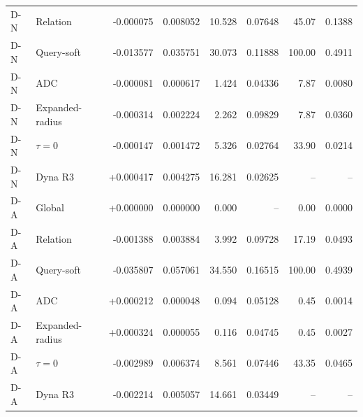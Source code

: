 \begin{table}[htbp]
\begin{tabular}{llrrrrrr}
D-N & Relation & -0.000075 & 0.008052 & 10.528 & 0.07648 & 45.07 & 0.1388\\
D-N & Query-soft & -0.013577 & 0.035751 & 30.073 & 0.11888 & 100.00 & 0.4911\\
D-N & ADC & -0.000081 & 0.000617 & 1.424 & 0.04336 & 7.87 & 0.0080\\
D-N & Expanded-radius & -0.000314 & 0.002224 & 2.262 & 0.09829 & 7.87 & 0.0360\\
D-N & $\tau=0$ & -0.000147 & 0.001472 & 5.326 & 0.02764 & 33.90 & 0.0214\\
D-N & Dyna R3 & +0.000417 & 0.004275 & 16.281 & 0.02625 & -- & --\\
\midrule
D-A & Global & +0.000000 & 0.000000 & 0.000 & -- & 0.00 & 0.0000\\
D-A & Relation & -0.001388 & 0.003884 & 3.992 & 0.09728 & 17.19 & 0.0493\\
D-A & Query-soft & -0.035807 & 0.057061 & 34.550 & 0.16515 & 100.00 & 0.4939\\
D-A & ADC & +0.000212 & 0.000048 & 0.094 & 0.05128 & 0.45 & 0.0014\\
D-A & Expanded-radius & +0.000324 & 0.000055 & 0.116 & 0.04745 & 0.45 & 0.0027\\
D-A & $\tau=0$ & -0.002989 & 0.006374 & 8.561 & 0.07446 & 43.35 & 0.0465\\
D-A & Dyna R3 & -0.002214 & 0.005057 & 14.661 & 0.03449 & -- & --\\
\bottomrule
\end{tabular}
\end{table}
